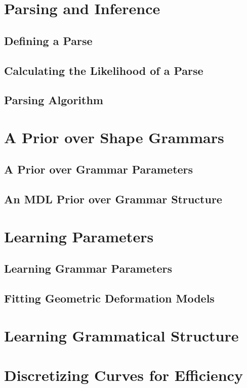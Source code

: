 \documentclass{article}
\begin{document}
\section{Parsing and Inference}
  \subsection{Defining a Parse}
  \subsection{Calculating the Likelihood of a Parse}
  \subsection{Parsing Algorithm}
\section{A Prior over Shape Grammars}
  \subsection{A Prior over Grammar Parameters}
  \subsection{An MDL Prior over Grammar Structure}
\section{Learning Parameters}
  \subsection{Learning Grammar Parameters}
  \subsection{Fitting Geometric Deformation Models}
\section{Learning Grammatical Structure}
\section{Discretizing Curves for Efficiency}
\end{document}
